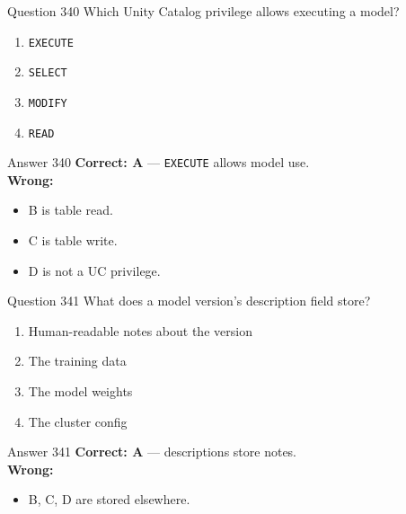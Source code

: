 \documentclass[aspectratio=169,11pt]{beamer}
\begin{document}
	\begin{frame}{Question 340}
		Which Unity Catalog privilege allows executing a model?
		\begin{enumerate}[label=\Alph*.]
			\item \texttt{EXECUTE}
			\item \texttt{SELECT}
			\item \texttt{MODIFY}
			\item \texttt{READ}
		\end{enumerate}
	\end{frame}
	\begin{frame}{Answer 340}
		\textbf{Correct: A} --- \texttt{EXECUTE} allows model use.\\
		\vspace{0.5em}
		\textbf{Wrong:}
		\begin{itemize}
			\item B is table read.
			\item C is table write.
			\item D is not a UC privilege.
		\end{itemize}
	\end{frame}
	
	\begin{frame}{Question 341}
		What does a model version's description field store?
		\begin{enumerate}[label=\Alph*.]
			\item Human-readable notes about the version
			\item The training data
			\item The model weights
			\item The cluster config
		\end{enumerate}
	\end{frame}
	\begin{frame}{Answer 341}
		\textbf{Correct: A} --- descriptions store notes.\\
		\vspace{0.5em}
		\textbf{Wrong:}
		\begin{itemize}
			\item B, C, D are stored elsewhere.
		\end{itemize}
	\end{frame}
	
\end{document}
